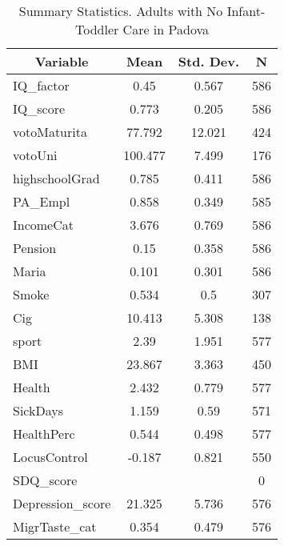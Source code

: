 
\begin{table}[htbp]\centering \caption{Summary Statistics. Adults with No Infant-Toddler Care in Padova \label{bothAdultasiloNonePadova}}
\begin{tabular}{l c c  c}\hline\hline
\multicolumn{1}{c}{\textbf{Variable}} & \textbf{Mean}
 & \textbf{Std. Dev.} & \textbf{N}\\ \hline
IQ\_factor & 0.45 & 0.567  & 586\\
IQ\_score & 0.773 & 0.205  & 586\\
votoMaturita & 77.792 & 12.021  & 424\\
votoUni & 100.477 & 7.499  & 176\\
highschoolGrad & 0.785 & 0.411  & 586\\
PA\_Empl & 0.858 & 0.349  & 585\\
IncomeCat & 3.676 & 0.769  & 586\\
Pension & 0.15 & 0.358  & 586\\
Maria & 0.101 & 0.301  & 586\\
Smoke & 0.534 & 0.5  & 307\\
Cig & 10.413 & 5.308  & 138\\
sport & 2.39 & 1.951  & 577\\
BMI & 23.867 & 3.363  & 450\\
Health & 2.432 & 0.779  & 577\\
SickDays & 1.159 & 0.59  & 571\\
HealthPerc & 0.544 & 0.498  & 577\\
LocusControl & -0.187 & 0.821  & 550\\
SDQ\_score &  &   & 0\\
Depression\_score & 21.325 & 5.736  & 576\\
MigrTaste\_cat & 0.354 & 0.479  & 576\\
\hline\end{tabular}
\end{table}
